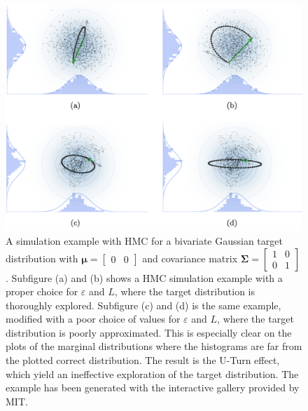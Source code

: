 \begin{figure}
    \centering
    \includegraphics[width=\textwidth]{pics/HMC_Example.png}
    \caption{A simulation example with HMC for a bivariate Gaussian target distribution with $\boldsymbol{\mu}= \begin{bmatrix}
            0 & 0
            \end{bmatrix}$ and covariance matrix
            $\boldsymbol{\Sigma}= 
            \begin{bmatrix}
                1 & 0\\
                0 & 1   
            \end{bmatrix}$. Subfigure (a) and (b) shows a HMC simulation example with a proper choice for $\varepsilon$ and $L$, where the target distribution is thoroughly explored. Subfigure (c) and (d) is the same example, modified with a poor choice of values for $\varepsilon$ and $L$, where the target distribution is poorly approximated. This is especially clear on the plots of the marginal distributions where the histograms are far from the plotted correct distribution. The result is the U-Turn effect, which yield an ineffective exploration of the target distribution. The example has been generated with the interactive gallery provided by \cite{feng} \textcopyright MIT.}
    \label{fig:HMC_Example}
\end{figure}


